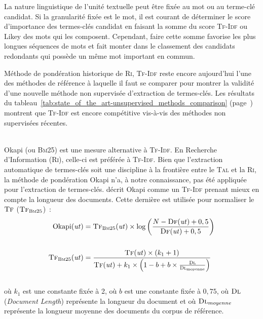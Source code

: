         La nature linguistique de l'unité textuelle peut être fixée au mot ou au
        terme-clé candidat. Si la granularité fixée est le mot, il est courant
        de déterminer le score d'importance des termes-clés candidat en faisant
        la somme du score \textsc{Tf-Idf} ou Likey des mots qui les composent.
        Cependant, faire cette somme favorise les plus longues séquences de mots
        et fait monter dans le classement des candidats redondants qui possède
        un même mot important en commun.

        Méthode de pondération historique de \textsc{Ri}, \textsc{Tf-Idf} reste
        encore aujourd'hui l'une des méthodes de référence à laquelle il faut se
        comparer pour montrer la validité d'une nouvelle méthode non supervisée
        d'extraction de termes-clés. Les résultats du
        tableau~\ref{tab:state_of_the_art-unsupervised_methods_comparison}
        (page~\pageref{tab:state_of_the_art-unsupervised_methods_comparison})
        montrent que \textsc{Tf-Idf} est encore compétitive vis-à-vis des
        méthodes non supervisées récentes.

        ~\\Okapi (ou \textsc{Bm}25) \cite{robertson1999okapi} est une mesure
        alternative à \textsc{Tf-Idf}. En Recherche d'Information (\textsc{Ri}),
        celle-ci est préférée à \textsc{Tf-Idf}. Bien que l'extraction
        automatique de termes-clés soit une discipline à la frontière entre le
        \textsc{Tal} et la \textsc{Ri}, la méthode de pondération Okapi n'a, à
        notre connaissance, pas été appliquée pour l'extraction de termes-clés.
         décrit Okapi comme un \textsc{Tf-Idf}
        prenant mieux en compte la longueur des documents. Cette dernière est
        utilisée pour normaliser le $\textsc{Tf}$
        ($\textsc{Tf}_{\textsc{Bm}25}$)~:
        \begin{align}
          \text{Okapi}(\text{\textit{ut}}) &= \textsc{Tf}_{\textsc{Bm}25}(\text{\textit{ut}}) \times \log\left(\frac{N - \textsc{Df}(\text{\textit{ut}}) + 0,5}{\textsc{Df}(\text{\textit{ut}}) + 0,5}\right) \label{math:okapi}\\
          \notag\\
          \textsc{Tf}_{\textsc{Bm}25}(\text{\textit{ut}}) &= \frac{\textsc{Tf}(\text{\textit{ut}}) \times (k_1 + 1)}{\textsc{Tf}(\text{\textit{ut}}) + k_1 \times \left(1 - b + b \times \frac{\textsc{Dl}}{\textsc{Dl}_{\text{moyenne}}}\right)} \label{math:tf_bm25}
        \end{align}\\
        où $k_1$ est une constante fixée à 2, où $b$ est une constante fixée à
        $0,75$, où $\textsc{Dl}$ (\textit{Document Length}) représente la
        longueur du document et où $\textsc{Dl}_{moyenne}$ représente la
        longueur moyenne des documents du corpus de référence.

